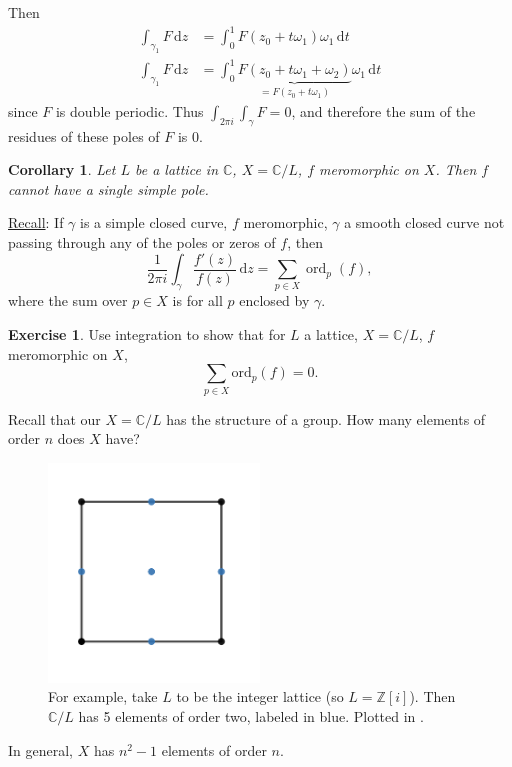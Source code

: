 \documentclass[12pt]{article}
\newcommand{\z}{\mathbb{Z}}
\newcommand{\cx}{\mathbb{C}}
\newtheorem{corollary}{Corollary}[theorem]
\theoremstyle{definition}
\newtheorem{exercise}{Exercise}
\theoremstyle{remark}
\DeclareMathOperator\ord{ord}
\begin{document}
Then 
\begin{equation}
    \begin{split}
        \int_{\gamma_1} F \,\mathrm{d}z & = \int_0^1 F(z_0 + t \omega_1) \omega_1 \, \mathrm{d}t \\
        \int_{\gamma_1} F \,\mathrm{d}z & = \int_0^1 \underbrace{ F(z_0 + t \omega_1 + \omega_2) }_{ = F(z_0 + t \omega_1)} \omega_1 \, \mathrm{d}t
    \end{split}
\end{equation}
since $F$ is double periodic. Thus $\int_{2 \pi i} \int_{\gamma} F = 0$, and therefore the sum of the residues of these poles of $F$ is 0.
\begin{corollary}
    Let $L$ be a lattice in $\cx$, $X = \cx / L$, $f$ meromorphic on $X$. Then $f$ cannot have a single simple pole.
\end{corollary}
\noindent \underline{Recall}: If $\gamma$ is a simple closed curve, $f$ meromorphic, $\gamma$ a smooth closed curve not passing through any of the poles or zeros of $f$, then 
\begin{equation}
    \frac{1}{2 \pi i} \int_{\gamma} \frac{f'(z)}{f(z)} \, \mathrm{d}z = \sum\limits_{p \in X} \ord_p(f),
\end{equation}
where the sum over $p \in X$ is for all $p$ enclosed by $\gamma$. 
\begin{exercise}
    Use integration to show that for $L$ a lattice, $X = \cx / L$, $f$ meromorphic on $X$,
    \begin{equation}
        \sum\limits_{p \in X} \mathrm{ord}_p (f) = 0.
    \end{equation}
\end{exercise}
Recall that our $X = \cx / L$ has the structure of a group. How many elements of order $n$ does $X$ have?
\begin{figure}[H]
    \centering
    \includegraphics[width = 0.5\textwidth]{12.png}
    \caption{For example, take $L$ to be the integer lattice (so $L = \z[i]$). Then $\cx / L$ has 5 elements of order two, labeled in blue. Plotted in \cite{Desmos}.}
    \label{fig:Fig12}
\end{figure}
In general, $X$ has $n^2 - 1$ elements of order $n$. 
\end{document}
